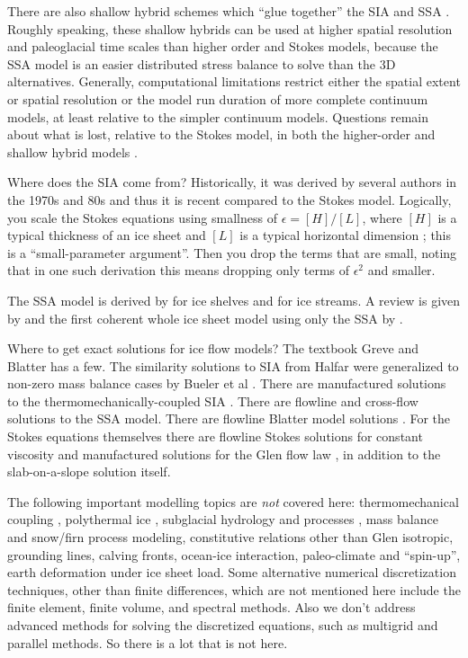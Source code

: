 \documentclass[titlepage,letterpaper,final,12pt]{scrartcl}
\newcommand{\eps}{\epsilon}
\begin{document}
There are also shallow hybrid schemes which ``glue together'' the SIA and SSA \cite{PollardDeConto,BBssasliding,Goldberg2011}.  Roughly speaking, these shallow hybrids can be used at higher spatial resolution and paleoglacial time scales than higher order and Stokes models, because the SSA model is an easier distributed stress balance to solve than the 3D alternatives.  Generally, computational limitations restrict either the spatial extent or spatial resolution or the model run duration of more complete continuum models, at least relative to the simpler continuum models.  Questions remain about what is lost, relative to the Stokes model, in both the higher-order and shallow hybrid models \cite[for example]{ISMIPHOM}.

Where does the SIA come from?    Historically, it was derived by several authors in the 1970s and 80s \cite{FowlerLarson1978,MorlandJohnson,Hutter} and thus it is recent compared to the Stokes model.  Logically, you scale the Stokes equations using smallness of $\eps = [H]/[L]$, where $[H]$ is a typical thickness of an ice sheet and $[L]$ is a typical horizontal dimension \cite{Fowler}; this is a ``small-parameter argument''.  Then you drop the terms that are small, noting that in one such derivation this means dropping only terms of $\eps^2$ and smaller.

The SSA model is derived by \cite{Morland} for ice shelves and \cite{MacAyeal} for ice streams.  A review is given by \cite{WeisGreveHutter} and the first coherent whole ice sheet model using only the SSA by \cite{SchoofStream}.

Where to get exact solutions for ice flow models?  The textbook Greve and Blatter \cite{GreveBlatter2009} has a few.  The similarity solutions to SIA from Halfar \cite{Halfar81,Halfar83} were generalized to non-zero mass balance cases by Bueler et al \cite{BLKCB}.  There are manufactured solutions to the thermomechanically-coupled SIA  \cite{BBL}.  There are flowline \cite{vanderVeen83} and cross-flow \cite{SchoofStream} solutions to the SSA model.  There are flowline Blatter model solutions \cite{GlowinskiRappaz}.  For the Stokes equations themselves there are flowline Stokes solutions for constant viscosity \cite{BaliseRaymond1985} and manufactured solutions for the Glen flow law \cite{JouvetRappaz2011,SargentFastook2010}, in addition to the slab-on-a-slope solution itself.

The following important modelling topics are \emph{not} covered here: thermomechanical coupling \cite{BBL}, polythermal ice \cite{Greve,AschwandenBuelerKhroulevBlatter}, subglacial hydrology and processes \cite{Clarke05}, mass balance and snow/firn process modeling, constitutive relations other than Glen isotropic, grounding lines, calving fronts, ocean-ice interaction, paleo-climate and ``spin-up'', earth deformation under ice sheet load.  Some alternative numerical discretization techniques, other than finite differences, which are not mentioned here include the finite element, finite volume, and spectral methods.  Also we don't address advanced methods for solving the discretized equations, such as multigrid and parallel methods.  So there is a lot that is not here.

\small


\end{document}
